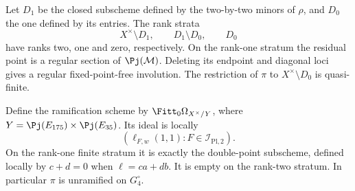 \begin{proposition}
\label{prop:global-pencil-rank-strata}
Let \(D_1\) be the closed subscheme defined by the two-by-two
minors of \(\rho\), and \(D_0\) the one defined by its
entries.  The rank strata
\[
 X^\times\setminus D_1,\qquad D_1\setminus D_0,\qquad D_0
\]
have ranks two, one and zero, respectively.  On the rank-one stratum
the residual point is a regular section of \(\Pj(\mathcal M)\).
Deleting its endpoint and diagonal loci gives a regular fixed-point-free
involution.  The restriction of \(\pi\) to
\(X^\times\setminus D_0\) is quasi-finite.

Define the ramification scheme by
\(\Fitt_0\Omega_{X^\times/Y}\), where
\(Y=\Pj(E_{175})\times\Pj(E_{35})\).  Its ideal is locally
\begin{equation}\label{eq:ramification-evaluation-ideal}
              (\ell_{F,w}(1,1):F\in\mathcal I_{\mathrm{Pl},2}).
\end{equation}
On the rank-one finite stratum it is exactly the double-point
subscheme, defined locally by \(c+d=0\) when
\(\ell=ca+db\).  It is empty on the rank-two stratum.  In
particular \(\pi\) is unramified on \(G_4^\circ\).
\end{proposition}
